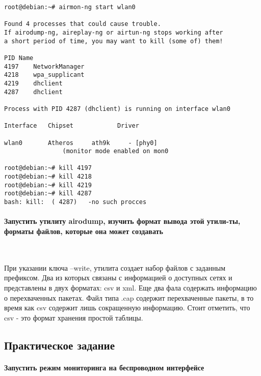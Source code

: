 \documentclass[10pt,a4paper]{article}
\begin{document}
\begin{verbatim}
root@debian:~# airmon-ng start wlan0

Found 4 processes that could cause trouble.
If airodump-ng, aireplay-ng or airtun-ng stops working after
a short period of time, you may want to kill (some of) them!

PID	Name
4197	NetworkManager
4218	wpa_supplicant
4219	dhclient
4287	dhclient

Process with PID 4287 (dhclient) is running on interface wlan0

Interface 	Chipset		       Driver

wlan0		Atheros 	ath9k     - [phy0]
				(monitor mode enabled on mon0
				
root@debian:~# kill 4197
root@debian:~# kill 4218
root@debian:~# kill 4219
root@debian:~# kill 4287
bash: kill:  ( 4287)   -no such procces   				
\end{verbatim}


\paragraph{Запустить утилиту airodump, изучить формат вывода этой утили-ты, форматы файлов, которые она может создавать}
~

При указании ключа --write, утилита создает набор файлов с заданным префиксом. Два из которых связаны с информацией о доступных сетях и представлены в двух форматах: csv и xml. Еще два фала содержать информацию о перехваченных пакетах. Файл типа .cap содержит перехваченные пакеты, в то время как csv содержит лишь сокращенную информацию. Стоит отметить, что csv - это формат хранения простой таблицы.

\subsection{Практическое задание}

\paragraph{Запустить режим мониторинга на беспроводном интерфейсе}
\end{document}
